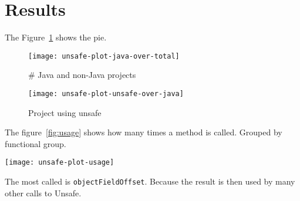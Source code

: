 
\section{Results} \label{sec:results}

The Figure~\ref{fig:java-over-total} shows the pie.

\begin{figure}[htb]
\centering
\texttt{[image: unsafe-plot-java-over-total]}
\caption{\# Java and non-Java projects} \label{fig:java-over-total}
\end{figure}

\begin{figure}[htb]
\centering
\texttt{[image: unsafe-plot-unsafe-over-java]}
\caption{Project using unsafe} \label{fig:unsafe-over-java}
\end{figure}

The figure~\ref{fig:usage} shows how many times a method is called. Grouped by functional group.

\begin{figure*}[htb]
\texttt{[image: unsafe-plot-usage]}
\caption{sun.misc.Unsafe methods usage} \label{fig:usage}
\end{figure*}

The most called is \texttt{objectFieldOffset}. Because the result is then used by many other calls to Unsafe.




